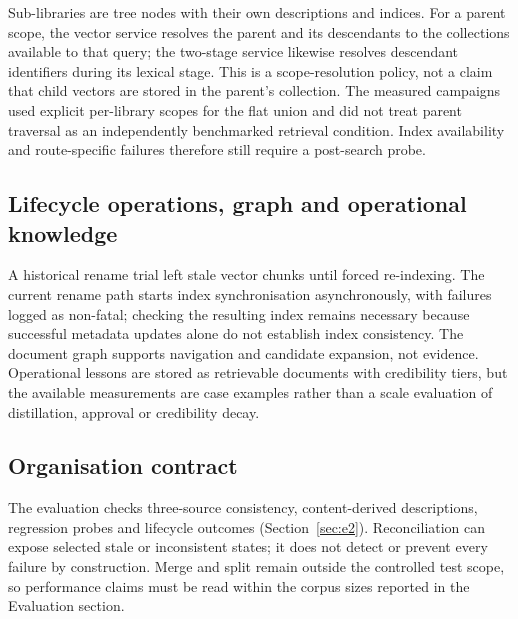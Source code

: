 Sub-libraries are tree nodes with their own descriptions and indices. For a
parent scope, the vector service resolves the parent and its descendants to the
collections available to that query; the two-stage service likewise resolves
descendant identifiers during its lexical stage. This is a scope-resolution
policy, not a claim that child vectors are stored in the parent's collection.
The measured campaigns used explicit per-library scopes for the flat union and
did not treat parent traversal as an independently benchmarked retrieval
condition. Index availability and route-specific failures therefore still
require a post-search probe.

\subsection{Lifecycle operations, graph and operational knowledge}
\label{sec:org-lifecycle}
\label{sec:org-graph}
\label{sec:org-experience}

A historical rename trial left stale vector chunks until forced re-indexing.
The current rename path starts index synchronisation asynchronously, with
failures logged as non-fatal; checking the resulting index remains necessary
because successful metadata updates alone do not establish index consistency. The document graph supports navigation and candidate
expansion, not evidence. Operational lessons are stored as retrievable
documents with credibility tiers, but the available measurements are case
examples rather than a scale evaluation of distillation, approval or
credibility decay.

\subsection{Organisation contract}
\label{sec:org-integrity}
\label{sec:org-summary}

The evaluation checks three-source consistency, content-derived descriptions,
regression probes and lifecycle outcomes (Section~\ref{sec:e2}). Reconciliation
can expose selected stale or inconsistent states; it does not detect or prevent
every failure by construction. Merge and split remain outside the controlled test
scope, so performance claims must be read within the corpus sizes reported in
the Evaluation section.
